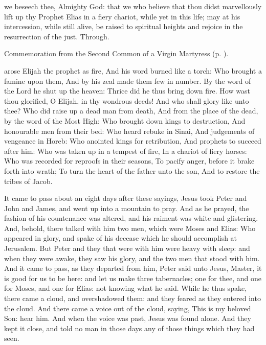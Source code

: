 \collect
{} we beseech thee, Almighty God: that we who believe that thou didst marvellously lift up thy Prophet Elias in a fiery chariot, while yet in this life; may at his intercession, while still alive, be raised to spiritual heights and rejoice in the resurrection of the just. Through.
\begin{rubric}
	Commemoration  from the Second Common of a Virgin Martyress (p. \pageref{CommonVirginMartyrII}).
\end{rubric}

 arose Elijah the prophet as fire, And his word burned like a torch:  Who brought a famine upon them, And by his zeal made them few in number. By the word of the Lord he shut up the heaven: Thrice did he thus bring down fire. How wast thou glorified, O Elijah, in thy wondrous deeds! And who shall glory like unto thee? Who did raise up a dead man from death, And from the place of the dead, by the word of the Most High: Who brought down kings to destruction, And honourable men from their bed: Who heard rebuke in Sinai, And judgements of vengeance in Horeb: Who anointed kings for retribution, And prophets to succeed after him: Who was taken up in a tempest of fire, In a chariot of fiery horses: Who was recorded for reproofs in their seasons, To pacify anger, before it brake forth into wrath; To turn the heart of the father unto the son, And to restore the tribes of Jacob. 


 It came to pass about an eight days after these sayings, Jesus took Peter and John and James, and went up into a mountain to pray. And as he prayed, the fashion of his countenance was altered, and his raiment was white and glistering. And, behold, there talked with him two men, which were Moses and Elias: Who appeared in glory, and spake of his decease which he should accomplish at Jerusalem. But Peter and they that were with him were heavy with sleep: and when they were awake, they saw his glory, and the two men that stood with him. And it came to pass, as they departed from him, Peter said unto Jesus, Master, it is good for us to be here: and let us make three tabernacles; one for thee, and one for Moses, and one for Elias: not knowing what he said. While he thus spake, there came a cloud, and overshadowed them: and they feared as they entered into the cloud. And there came a voice out of the cloud, saying, This is my beloved Son: hear him. And when the voice was past, Jesus was found alone. And they kept it close, and told no man in those days any of those things which they had seen.

